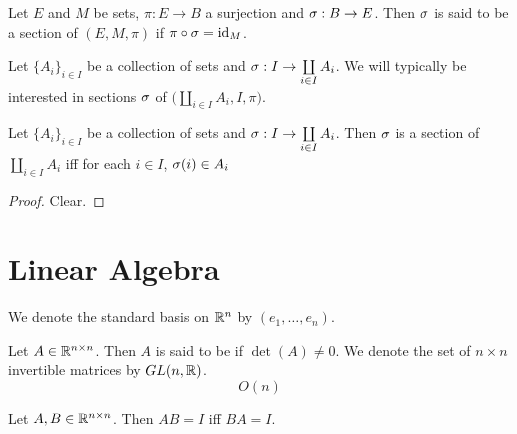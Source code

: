 \documentclass{book}
\begin{document}
	\begin{defn}
		Let $E$ and $M$ be sets, $\pi:E \rightarrow B$ a surjection and $\sigma: B \rightarrow E$. Then $\sigma$ is said to be a section of $(E, M, \pi)$ if $\pi \circ \sigma = \operatorname{id}_{M}$. 
	\end{defn}

	\begin{note}
		Let $\{A_i\}_{i \in I}$ be a collection of sets and $\sigma: I \rightarrow \coprod\limits_{i \in I} A_i$. We will typically be interested in sections $\sigma$ of $\bigg( \coprod\limits_{i \in I} A_i, I, \pi \bigg)$.
	\end{note}

	\begin{ex}
		Let $\{A_i\}_{i \in I}$ be a collection of sets and $\sigma: I \rightarrow \coprod\limits_{i \in I} A_i$. Then $\sigma$ is a section of $\coprod\limits_{i \in I} A_i$ iff for each $i \in I$, $\sigma(i) \in A_i$
	\end{ex}
	
	\begin{proof}
		Clear.
	\end{proof}















	\newpage
	\section{Linear Algebra}
	
	\begin{note}
		We denote the standard basis on $\mathbb{R}^n$ by $(e_1, \ldots, e_n)$.
	\end{note}

	\begin{defn} 
		Let $A \in \mathbb{R}^{n \times n}$. Then $A$ is said to be  if $\det(A) \neq 0$. We denote the set of $n \times n$ invertible matrices by $GL(n, \mathbb{R})$.
		$$O(n)$$
	\end{defn}

	\begin{ex} 
		Let $A,B \in \mathbb{R}^{n \times n}$. Then $AB = I$ iff $BA = I$.
	\end{ex}
\end{document}
